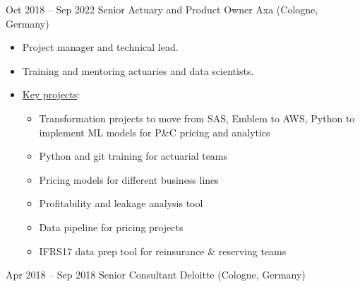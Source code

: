 \documentclass[a4paper,]{fortysecondscv}
\begin{document}
\begin{cvtable}
    \vspace{\topsep}
    \cvitem
    {Oct 2018 -- Sep 2022}
    {Senior Actuary and Product Owner}
    {Axa (Cologne, Germany)}
    {
        \vspace{-\topsep}
        \begin{itemize}[nosep, leftmargin=0pt] %
            \item Project manager and technical lead.
            \item Training and mentoring actuaries and data scientists.
            \item \underline{Key projects}:
                  \begin{itemize}
                      \item Transformation projects to move from SAS, Emblem to AWS, Python to implement ML models for P\&C pricing and analytics
                      \item Python and git training for actuarial teams
                      \item Pricing models for different business lines
                      \item Profitability and leakage analysis tool
                      \item Data pipeline for pricing projects
                      \item IFRS17 data prep tool for reinsurance \& reserving teams
                  \end{itemize}
        \end{itemize}
    }
    \vspace{\topsep}
    \cvitem
    {Apr 2018 -- Sep 2018}
    {Senior Consultant}
    {Deloitte (Cologne, Germany)}
    {
        \vspace{-\topsep}
}
\end{cvtable}
\end{document}
